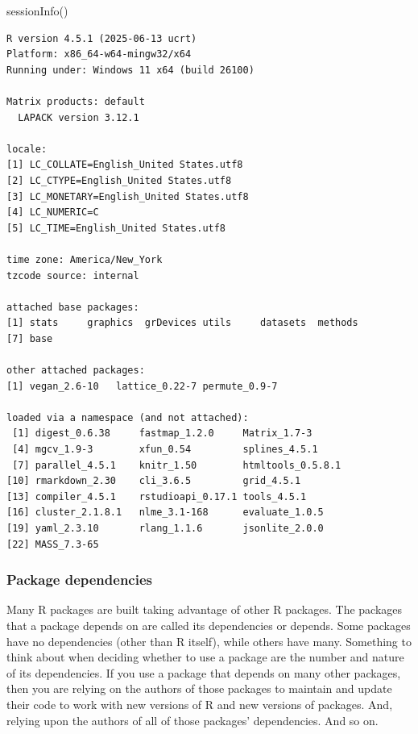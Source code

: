 \documentclass[
  13,
  letterpaper,
]{report}
\newenvironment{Shaded}{\begin{snugshade}}{\end{snugshade}}
\newcommand{\FunctionTok}[1]{\textcolor[rgb]{0.28,0.35,0.67}{#1}}
\newcommand{\NormalTok}[1]{\textcolor[rgb]{0.00,0.23,0.31}{#1}}
\begin{document}
\begin{Shaded}
\begin{Highlighting}[]
\FunctionTok{sessionInfo}\NormalTok{()}
\end{Highlighting}
\end{Shaded}

\begin{verbatim}
R version 4.5.1 (2025-06-13 ucrt)
Platform: x86_64-w64-mingw32/x64
Running under: Windows 11 x64 (build 26100)

Matrix products: default
  LAPACK version 3.12.1

locale:
[1] LC_COLLATE=English_United States.utf8 
[2] LC_CTYPE=English_United States.utf8   
[3] LC_MONETARY=English_United States.utf8
[4] LC_NUMERIC=C                          
[5] LC_TIME=English_United States.utf8    

time zone: America/New_York
tzcode source: internal

attached base packages:
[1] stats     graphics  grDevices utils     datasets  methods  
[7] base     

other attached packages:
[1] vegan_2.6-10   lattice_0.22-7 permute_0.9-7 

loaded via a namespace (and not attached):
 [1] digest_0.6.38     fastmap_1.2.0     Matrix_1.7-3     
 [4] mgcv_1.9-3        xfun_0.54         splines_4.5.1    
 [7] parallel_4.5.1    knitr_1.50        htmltools_0.5.8.1
[10] rmarkdown_2.30    cli_3.6.5         grid_4.5.1       
[13] compiler_4.5.1    rstudioapi_0.17.1 tools_4.5.1      
[16] cluster_2.1.8.1   nlme_3.1-168      evaluate_1.0.5   
[19] yaml_2.3.10       rlang_1.1.6       jsonlite_2.0.0   
[22] MASS_7.3-65      
\end{verbatim}

\subsubsection{Package dependencies}\label{sec-02-pack-work-dep}

Many R packages are built taking advantage of other R packages. The
packages that a package depends on are called its dependencies or
depends. Some packages have no dependencies (other than R itself), while
others have many. Something to think about when deciding whether to use
a package are the number and nature of its dependencies. If you use a
package that depends on many other packages, then you are relying on the
authors of those packages to maintain and update their code to work with
new versions of R and new versions of packages. And, relying upon the
authors of all of those packages' dependencies. And so on.
\end{document}

